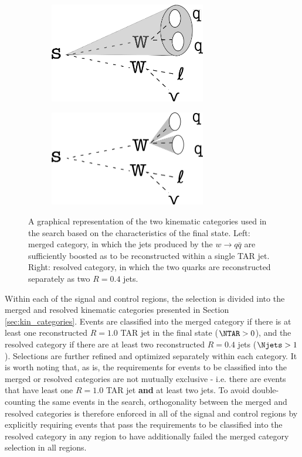 \begin{figure}[htbp]
	\centering
	\begin{subfigure}[t]{0.45\textwidth}
	\centering
	\includegraphics[width=0.75\textwidth]{Figures/5/merged.pdf}
	\end{subfigure}
	\begin{subfigure}[t]{.45\textwidth}
	\centering
	\includegraphics[width=0.75\textwidth]{Figures/5/resolved.png}
	\end{subfigure}
	\caption{A graphical representation of the two kinematic categories used in the search based on the characteristics of the final state. Left: merged category, in which the jets produced by the \(w\rightarrow q\bar{q}\) are sufficiently boosted as to be reconstructed within a single \largeR TAR jet. Right: resolved category, in which the two quarks are reconstructed separately as two \smallR \akt \(R=0.4\) jets.}
	\label{fig:categories}
\end{figure}

Within each of the signal and control regions, the selection is divided into the merged and resolved kinematic categories presented in Section \ref{sec:kin_categories}. Events are classified into the merged category if there is at least one reconstructed \(R=1.0\) TAR jet in the final state (\(\NTAR > 0\)), and the resolved category if there are at least two reconstructed \(R=0.4\) \smallR jets (\(\Njets > 1\)). Selections are further refined and optimized separately within each category. It is worth noting that, as is, the requirements for events to be classified into the merged or resolved categories are not mutually exclusive - i.e. there are events that have least one \(R=1.0\) TAR jet \textbf{and} at least two \smallR jets. To avoid double-counting the same events in the search, orthogonality between the merged and resolved categories is therefore enforced in all of the signal and control regions by explicitly requiring events that pass the requirements to be classified into the resolved category in any region to have additionally failed the merged category selection in all regions.  

